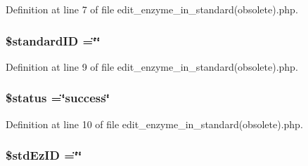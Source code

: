 Definition at line 7 of file edit\-\_\-enzyme\-\_\-in\-\_\-standard(obsolete).\-php.

\hypertarget{edit__enzyme__in__standard_07obsolete_08_8php_a0c541a369e4a0434108a7d145751bb23}{
\subsubsection[{\$standard\-I\-D}]{\setlength{\rightskip}{0pt plus 5cm}\$standard\-I\-D =\char`\"{}\char`\"{}}}\label{edit__enzyme__in__standard_07obsolete_08_8php_a0c541a369e4a0434108a7d145751bb23}


Definition at line 9 of file edit\-\_\-enzyme\-\_\-in\-\_\-standard(obsolete).\-php.

\hypertarget{edit__enzyme__in__standard_07obsolete_08_8php_a58391ea75f2d29d5d708d7050b641c33}{
\subsubsection[{\$status}]{\setlength{\rightskip}{0pt plus 5cm}\$status =\char`\"{}success\char`\"{}}}\label{edit__enzyme__in__standard_07obsolete_08_8php_a58391ea75f2d29d5d708d7050b641c33}


Definition at line 10 of file edit\-\_\-enzyme\-\_\-in\-\_\-standard(obsolete).\-php.

\hypertarget{edit__enzyme__in__standard_07obsolete_08_8php_a1a82343ffd9662108bf3501398fcd3fb}{
\subsubsection[{\$std\-Ez\-I\-D}]{\setlength{\rightskip}{0pt plus 5cm}\$std\-Ez\-I\-D =\char`\"{}\char`\"{}}}\label{edit__enzyme__in__standard_07obsolete_08_8php_a1a82343ffd9662108bf3501398fcd3fb}



